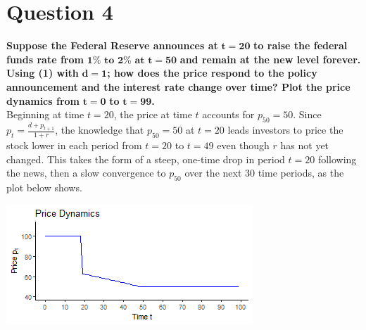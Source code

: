 \documentclass{article}
\begin{document}
\section*{Question 4}
\textbf{Suppose the Federal Reserve announces at} $\mathbf{t = 20}$ \textbf{to raise the federal funds rate from} $\mathbf{1\% \text{ to } 2\% \text{ at } t = 50}$ \textbf{and remain at the new level forever. Using (1) with} $\mathbf{d = 1}$\textbf{; how does the price respond to the policy announcement and the interest rate change over time? Plot the price dynamics from} $\mathbf{t = 0}$ \textbf{to} $\mathbf{t = 99}$\textbf{.}
\medskip \\
Beginning at time $t=20$, the price at time $t$ accounts for $p_{50}=50$. Since $p_t=\frac{d+p_{t+1}}{1+r}$, the knowledge that $p_{50}=50$ at $t=20$ leads investors to price the stock lower in each period from $t=20$ to $t=49$ even though $r$ has not yet changed. This takes the form of a steep, one-time drop in period $t=20$ following the news, then a slow convergence to $p_{50}$ over the next 30 time periods, as the plot below shows.
\begin{center}
\includegraphics[scale=1]{problem4_timeplot.png}
\end{center}



\end{document}
